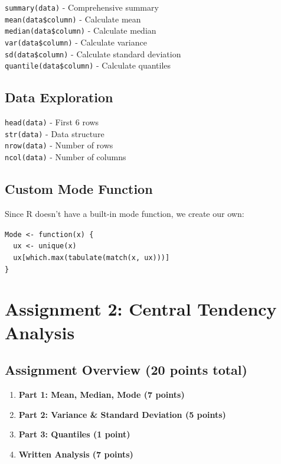 \documentclass[11pt,a4paper]{article}
\begin{document}
\begin{infobox}
\texttt{summary(data)} - Comprehensive summary\\
\texttt{mean(data\$column)} - Calculate mean\\
\texttt{median(data\$column)} - Calculate median\\
\texttt{var(data\$column)} - Calculate variance\\
\texttt{sd(data\$column)} - Calculate standard deviation\\
\texttt{quantile(data\$column)} - Calculate quantiles
\end{infobox}

\subsection{Data Exploration}

\begin{infobox}
\texttt{head(data)} - First 6 rows\\
\texttt{str(data)} - Data structure\\
\texttt{nrow(data)} - Number of rows\\
\texttt{ncol(data)} - Number of columns
\end{infobox}

\subsection{Custom Mode Function}

Since R doesn't have a built-in mode function, we create our own:

\begin{infobox}
\texttt{Mode <- function(x) \{}\\
\texttt{~~ux <- unique(x)}\\
\texttt{~~ux[which.max(tabulate(match(x, ux)))]}\\
\texttt{\}}
\end{infobox}

\section{Assignment 2: Central Tendency Analysis}

\subsection{Assignment Overview (20 points total)}

\begin{enumerate}
    \item \textbf{Part 1: Mean, Median, Mode (7 points)}
    \item \textbf{Part 2: Variance \& Standard Deviation (5 points)}
    \item \textbf{Part 3: Quantiles (1 point)}
    \item \textbf{Written Analysis (7 points)}
\end{enumerate}
\end{document}
